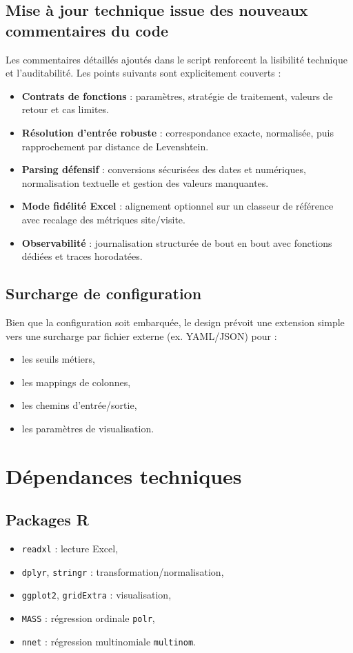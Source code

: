 \documentclass[11pt,a4paper]{article}
\begin{document}
\subsection{Mise à jour technique issue des nouveaux commentaires du code}
Les commentaires détaillés ajoutés dans le script renforcent la lisibilité
technique et l'auditabilité. Les points suivants sont explicitement couverts :
\begin{itemize}[leftmargin=1.2cm]
  \item \textbf{Contrats de fonctions} : paramètres, stratégie de traitement,
  valeurs de retour et cas limites.
  \item \textbf{Résolution d'entrée robuste} : correspondance exacte,
  normalisée, puis rapprochement par distance de Levenshtein.
  \item \textbf{Parsing défensif} : conversions sécurisées des dates et
  numériques, normalisation textuelle et gestion des valeurs manquantes.
  \item \textbf{Mode fidélité Excel} : alignement optionnel sur un classeur de
  référence avec recalage des métriques site/visite.
  \item \textbf{Observabilité} : journalisation structurée de bout en bout avec
  fonctions dédiées et traces horodatées.
\end{itemize}

\subsection{Surcharge de configuration}
Bien que la configuration soit embarquée, le design prévoit une extension simple
vers une surcharge par fichier externe (ex. YAML/JSON) pour :
\begin{itemize}[leftmargin=1.2cm]
  \item les seuils métiers,
  \item les mappings de colonnes,
  \item les chemins d'entrée/sortie,
  \item les paramètres de visualisation.
\end{itemize}

\section{Dépendances techniques}
\subsection{Packages R}
\begin{itemize}[leftmargin=1.2cm]
  \item \texttt{readxl} : lecture Excel,
  \item \texttt{dplyr}, \texttt{stringr} : transformation/normalisation,
  \item \texttt{ggplot2}, \texttt{gridExtra} : visualisation,
  \item \texttt{MASS} : régression ordinale \texttt{polr},
  \item \texttt{nnet} : régression multinomiale \texttt{multinom}.
\end{itemize}
\end{document}

